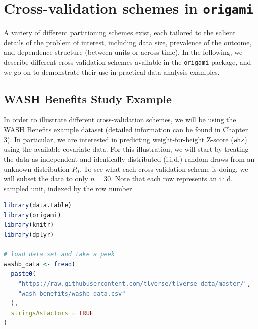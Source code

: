 \documentclass[
  12pt, krantz2,
]{krantz}
\newcommand{\passthrough}[1]{#1}
\newcommand{\1}{\mathbbm{1}}
\theoremstyle{definition}
\theoremstyle{definition}
\theoremstyle{definition}
\theoremstyle{definition}
\theoremstyle{remark}
\begin{document}
\hypertarget{cross-validation-schemes-in-origami}{%
\section{\texorpdfstring{Cross-validation schemes in \texttt{origami}}{Cross-validation schemes in origami}}\label{cross-validation-schemes-in-origami}}

A variety of different partitioning schemes exist, each tailored to the salient
details of the problem of interest, including data size, prevalence of the
outcome, and dependence structure (between units or across time). In the
following, we describe different cross-validation schemes available in the
\passthrough{\lstinline!origami!} package, and we go on to demonstrate their use in practical data
analysis examples.

\hypertarget{wash-benefits-study-example}{%
\subsection*{WASH Benefits Study Example}\label{wash-benefits-study-example}}


In order to illustrate different cross-validation schemes, we will be using the
WASH Benefits example dataset (detailed information can be found in
\protect\hyperlink{wash}{Chapter 3}). In particular, we are interested in predicting
weight-for-height Z-score (\passthrough{\lstinline!whz!}) using the available covariate data. For this
illustration, we will start by treating the data as independent and identically
distributed (i.i.d.) random draws from an unknown distribution \(P_0\). To
see what each cross-validation scheme is doing, we will subset the data to only
\(n=30\). Note that each row represents an i.i.d. sampled unit, indexed by the row
number.

\begin{lstlisting}[language=R]
library(data.table)
library(origami)
library(knitr)
library(dplyr)

# load data set and take a peek
washb_data <- fread(
  paste0(
    "https://raw.githubusercontent.com/tlverse/tlverse-data/master/",
    "wash-benefits/washb_data.csv"
  ),
  stringsAsFactors = TRUE
)
\end{lstlisting}
\end{document}
